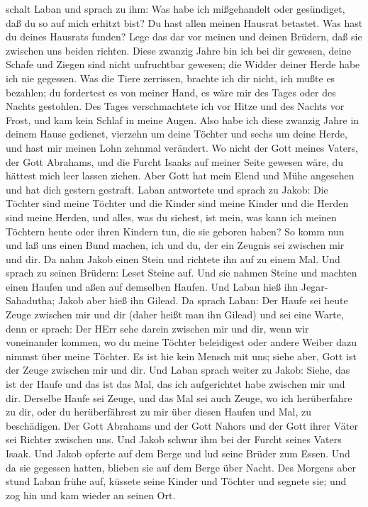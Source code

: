 schalt Laban und sprach zu ihm: Was habe ich mißgehandelt oder
gesündiget, daß du so auf mich erhitzt bist?  Du hast allen
meinen Hausrat betastet. Was hast du deines Hausrats funden? Lege das
dar vor meinen und deinen Brüdern, daß sie zwischen uns beiden richten.
 Diese zwanzig Jahre bin ich bei dir gewesen, deine Schafe
und Ziegen sind nicht unfruchtbar gewesen; die Widder deiner Herde habe
ich nie gegessen.  Was die Tiere zerrissen, brachte ich dir
nicht, ich mußte es bezahlen; du fordertest es von meiner Hand, es wäre
mir des Tages oder des Nachts gestohlen.  Des Tages
verschmachtete ich vor Hitze und des Nachts vor Frost, und kam kein
Schlaf in meine Augen.  Also habe ich diese zwanzig Jahre
in deinem Hause gedienet, vierzehn um deine Töchter und sechs um deine
Herde, und hast mir meinen Lohn zehnmal verändert.  Wo
nicht der Gott meines Vaters, der Gott Abrahams, und die Furcht Isaaks
auf meiner Seite gewesen wäre, du hättest mich leer lassen ziehen. Aber
Gott hat mein Elend und Mühe angesehen und hat dich gestern gestraft.
 Laban antwortete und sprach zu Jakob: Die Töchter sind
meine Töchter und die Kinder sind meine Kinder und die Herden sind meine
Herden, und alles, was du siehest, ist mein, was kann ich meinen
Töchtern heute oder ihren Kindern tun, die sie geboren haben?
 So komm nun und laß uns einen Bund machen, ich und du, der
ein Zeugnis sei zwischen mir und dir.  Da nahm Jakob einen
Stein und richtete ihn auf zu einem Mal.  Und sprach zu
seinen Brüdern: Leset Steine auf. Und sie nahmen Steine und machten
einen Haufen und aßen auf demselben Haufen.  Und Laban hieß
ihn Jegar-Sahadutha; Jakob aber hieß ihn Gilead.  Da sprach
Laban: Der Haufe sei heute Zeuge zwischen mir und dir (daher heißt man
ihn Gilead)  und sei eine Warte, denn er sprach: Der HErr
sehe darein zwischen mir und dir, wenn wir voneinander kommen,
 wo du meine Töchter beleidigest oder andere Weiber dazu
nimmst über meine Töchter. Es ist hie kein Mensch mit uns; siehe aber,
Gott ist der Zeuge zwischen mir und dir.  Und Laban sprach
weiter zu Jakob: Siehe, das ist der Haufe und das ist das Mal, das ich
aufgerichtet habe zwischen mir und dir.  Derselbe Haufe sei
Zeuge, und das Mal sei auch Zeuge, wo ich herüberfahre zu dir, oder du
herüberfährest zu mir über diesen Haufen und Mal, zu beschädigen.
 Der Gott Abrahams und der Gott Nahors und der Gott ihrer
Väter sei Richter zwischen uns.  Und Jakob schwur ihm bei
der Furcht seines Vaters Isaak. Und Jakob opferte auf dem Berge und lud
seine Brüder zum Essen. Und da sie gegessen hatten, blieben sie auf dem
Berge über Nacht.  Des Morgens aber stund Laban frühe auf,
küssete seine Kinder und Töchter und segnete sie; und zog hin und kam
wieder an seinen Ort.

